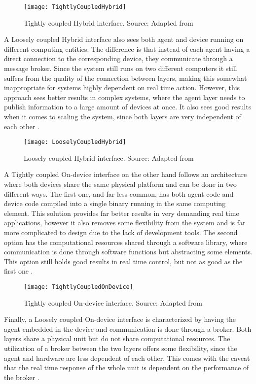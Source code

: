\begin{figure}
	\centering
	\texttt{[image: TightlyCoupledHybrid]}
	\caption{Tightly coupled Hybrid interface. Source: Adapted from \cite{8591641}}
\end{figure}

A Loosely coupled Hybrid interface also sees both agent and device running on different computing entities. The difference is that instead of each agent having a direct connection to the corresponding device, they communicate through a message broker. Since the system still runs on two different computers it still suffers from the quality of the connection between layers, making this somewhat inappropriate for systems highly dependent on real time action. However, this approach sees better results in complex systems, where the agent layer needs to publish information to a large amount of devices at once. It also sees good results when it comes to scaling the system, since both layers are very independent of each other \cite{8591641}.\\

\begin{figure}
	\centering
	\texttt{[image: LooselyCoupledHybrid]}
	\caption{Loosely coupled Hybrid interface. Source: Adapted from \cite{8591641}}
\end{figure}

A Tightly coupled On-device interface on the other hand follows an architecture where both devices share the same physical platform and can be done in two different ways. The first one, and far less common, has both agent code and device code compiled into a single binary running in the same computing element. This solution provides far better results in very demanding real time applications, however it also removes some flexibility from the system and is far more complicated to design due to the lack of development tools. The second option has the computational resources shared through a software library, where communication is done through software functions but abstracting some elements. This option still holds good results in real time control, but not as good as the first one \cite{8591641}.\\

\begin{figure}
	\centering
	\texttt{[image: TightlyCoupledOnDevice]}
	\caption{Tightly coupled On-device interface. Source: Adapted from \cite{8591641}}
\end{figure}

Finally, a Loosely coupled On-device interface is characterized by having the agent embedded in the device and communication is done through a broker. Both layers share a physical unit but do not share computational resources. The utilization of a broker between the two layers offers some flexibility, since the agent and hardware are less dependent of each other. This comes with the caveat that the real time response of the whole unit is dependent on the performance of the broker \cite{8591641}.

